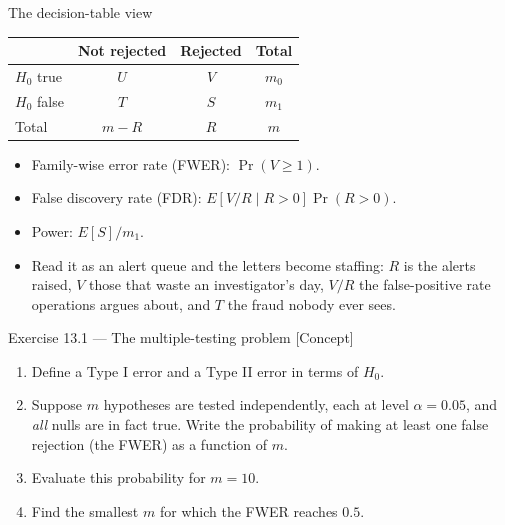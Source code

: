 \documentclass[aspectratio=169,11pt]{beamer}
\begin{document}
\begin{frame}{The decision-table view}
  \begin{center}
  \begin{tabular}{l|cc|c}
    \toprule
            & Not rejected & Rejected & Total \\
    \midrule
    $H_0$ true   & $U$ & $V$ & $m_0$ \\
    $H_0$ false  & $T$ & $S$ & $m_1$ \\
    \midrule
    Total & $m - R$ & $R$ & $m$ \\
    \bottomrule
  \end{tabular}
  \end{center}
  \begin{readme}
    \begin{itemize}
      \item Family-wise error rate (FWER): $\Pr(V \ge 1)$.
      \item False discovery rate (FDR): $E[V/R \mid R > 0]\Pr(R > 0)$.
      \item Power: $E[S]/m_1$.
      \item Read it as an alert queue and the letters become staffing: $R$ is the alerts
            raised, $V$ those that waste an investigator's day, $V/R$ the false-positive
            rate operations argues about, and $T$ the fraud nobody ever sees.
    \end{itemize}
  \end{readme}
\end{frame}



\begin{frame}{Exercise 13.1 --- The multiple-testing problem [Concept]}
\begin{exercise}
  \begin{enumerate}
    \item Define a Type I error and a Type II error in terms of $H_0$.
    \item Suppose $m$ hypotheses are tested independently, each at
          level $\alpha = 0.05$, and \emph{all} nulls are in fact
          true. Write the probability of making at least one false
          rejection (the FWER) as a function of $m$.
    \item Evaluate this probability for $m = 10$.
    \item Find the smallest $m$ for which the FWER reaches $0.5$.
  \end{enumerate}
\end{exercise}
\end{frame}
\end{document}
